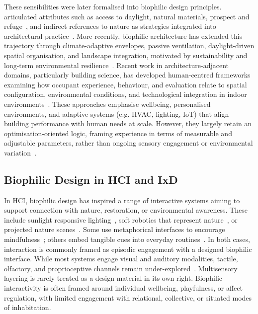 These sensibilities were later formalised into biophilic design principles. \citet{kellert2018nature} articulated attributes such as access to daylight, natural materials, prospect and refuge~\cite{dosen2016evidence}, and indirect references to nature as strategies integrated into architectural practice~\cite{kellert1995biophilia, kellert2018nature, kellert2008dimensions}. More recently, biophilic architecture has extended this trajectory through climate-adaptive envelopes, passive ventilation, daylight-driven spatial organisation, and landscape integration, motivated by sustainability and long-term environmental resilience~\cite{tekin2023impact}. Recent work in architecture-adjacent domains, particularly building science, has developed human-centred frameworks examining how occupant experience, behaviour, and evaluation relate to spatial configuration, environmental conditions, and technological integration in indoor environments~\cite{khan2025building, roofigari2025conceptual, economidou2024lived}. These approaches emphasise wellbeing, personalised environments, and adaptive systems (e.g. HVAC, lighting, IoT) that align building performance with human needs at scale. However, they largely retain an optimisation-oriented logic, framing experience in terms of measurable and adjustable parameters, rather than ongoing sensory engagement or environmental variation~\cite{becerik2022ten}.


\subsection{Biophilic Design in HCI and IxD}
In HCI, biophilic design has inspired a range of interactive systems aiming to support connection with nature, restoration, or environmental awareness. These include sunlight responsive lighting~\cite{wang2015intelligent}, soft robotics that represent nature~\cite{chooi2022symbiosis, sabinson2021plant, sabinson2024every}, or projected nature scenes~\cite{sabinson2023walk}. Some use metaphorical interfaces to encourage mindfulness~\cite{wang2022nature, jung2024leaf}; others embed tangible cues into everyday routines~\cite{nam2023florawear, loh2010please}. In both cases, interaction is commonly framed as episodic engagement with a designed biophilic interface. While most systems engage visual and auditory modalities, tactile, olfactory, and proprioceptive channels remain under-explored~\cite{dias2024quantifying, yildirimmultisensory}. Multisensory layering is rarely treated as a design material in its own right. Biophilic interactivity is often framed around individual wellbeing, playfulness, or affect regulation, with limited engagement with relational, collective, or situated modes of inhabitation.



